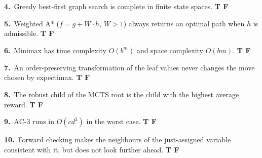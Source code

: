 \documentclass[11pt,a4paper]{article}
\newcommand{\subq}[1]{\par\smallskip\noindent\textbf{#1}\ }
\begin{document}
\begin{ansbox}[height=1.5cm]\end{ansbox}
\subq{4.}Greedy best-first graph search is complete in finite state spaces. \hfill \textbf{T \quad F}
\begin{ansbox}[height=1.5cm]\end{ansbox}
\subq{5.}Weighted A* ($f=g+W\cdot h$, $W>1$) always returns an optimal path when $h$ is admissible. \hfill \textbf{T \quad F}
\begin{ansbox}[height=1.5cm]\end{ansbox}
\subq{6.}Minimax has time complexity $O(b^m)$ and space complexity $O(bm)$. \hfill \textbf{T \quad F}
\begin{ansbox}[height=1.5cm]\end{ansbox}
\subq{7.}An order-preserving transformation of the leaf values never changes the move chosen by expectimax. \hfill \textbf{T \quad F}
\begin{ansbox}[height=1.5cm]\end{ansbox}
\subq{8.}The robust child of the MCTS root is the child with the highest average reward. \hfill \textbf{T \quad F}
\begin{ansbox}[height=1.5cm]\end{ansbox}
\subq{9.}AC-3 runs in $O(cd^3)$ in the worst case. \hfill \textbf{T \quad F}
\begin{ansbox}[height=1.5cm]\end{ansbox}
\subq{10.}Forward checking makes the neighbours of the just-assigned variable consistent with it, but does not look further ahead. \hfill \textbf{T \quad F}
\begin{ansbox}[height=1.5cm]\end{ansbox}
\end{document}
